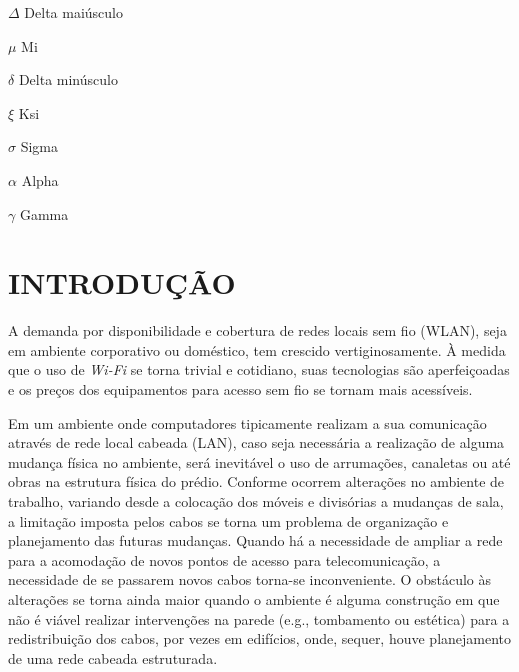 \documentclass[
	12pt,				%
	openright,			%
	twoside,			%
	a4paper,			%
	english,			%
	french,				%
	spanish,			%
	brazil				%
	]{abntex2}
\begin{document}
\begin{simbolos}
  \item[$ \Delta $] Delta maiúsculo
  \item[$ \mu $] Mi
  \item[$ \delta $] Delta minúsculo
  \item[$ \xi $] Ksi
  \item[$ \sigma $] Sigma
  \item[$ \alpha $] Alpha
  \item[$ \gamma $] Gamma
\end{simbolos}

\tableofcontents*
\cleardoublepage

\textual
\chapter[INTRODUÇÃO]{INTRODUÇÃO}

A demanda por disponibilidade e cobertura de redes locais sem fio (WLAN), seja em ambiente corporativo ou doméstico, tem crescido vertiginosamente. À medida que o uso de \textit{Wi-Fi} se torna trivial e cotidiano, suas tecnologias são aperfeiçoadas e os preços dos equipamentos para acesso sem fio se tornam mais acessíveis.

Em um ambiente onde computadores tipicamente realizam a sua comunicação através de rede local cabeada (LAN), caso seja necessária a realização de alguma mudança física no ambiente, será inevitável o uso de arrumações, canaletas ou até obras na estrutura física do prédio. Conforme ocorrem alterações no ambiente de trabalho, variando desde a colocação dos móveis e divisórias a mudanças de sala, a limitação imposta pelos cabos se torna um problema de organização e planejamento das futuras mudanças. Quando há a necessidade de ampliar a rede para a acomodação de novos pontos de acesso para telecomunicação, a necessidade de se passarem novos cabos torna-se inconveniente. O obstáculo às alterações se torna ainda maior quando o ambiente é alguma construção em que não é viável realizar intervenções na parede (e.g., tombamento ou estética) para a redistribuição dos cabos, por vezes em edifícios, onde, sequer, houve planejamento de uma rede cabeada estruturada.
\end{document}
